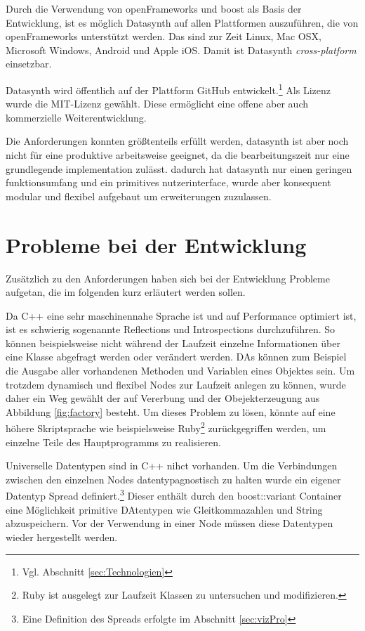 \documentclass[a4paper, 12pt, DIVcalc, onepage, pdftex, headsepline, footsepline]{scrreprt}
\begin{document}
Durch die Verwendung von openFrameworks und boost als Basis der Entwicklung,
ist es möglich Datasynth auf allen Plattformen auszuführen, die von openFrameworks
unterstützt werden. Das sind zur Zeit Linux, Mac OSX, Microsoft Windows, Android
und Apple iOS. Damit ist Datasynth \textit{cross-platform} einsetzbar.

Datasynth wird öffentlich auf der Plattform GitHub entwickelt.\footnote{Vgl.
Abschnitt \ref{sec:Technologien}} Als Lizenz wurde die MIT-Lizenz gewählt.
Diese ermöglicht eine offene aber auch kommerzielle Weiterentwicklung.

Die Anforderungen konnten größtenteils erfüllt werden, datasynth ist aber noch nicht für eine produktive
arbeitsweise geeignet, da die bearbeitungszeit nur eine grundlegende implementation
zulässt. dadurch hat datasynth nur einen geringen funktionsumfang und ein primitives
nutzerinterface, wurde aber konsequent modular und flexibel aufgebaut um erweiterungen
zuzulassen.

\section{Probleme bei der Entwicklung}
\label{sec:Probleme}
Zusätzlich zu den Anforderungen haben sich bei der Entwicklung Probleme aufgetan,
die im folgenden kurz erläutert werden sollen.

Da C++ eine sehr maschinennahe Sprache ist und auf Performance optimiert ist,
ist es schwierig sogenannte Reflections und Introspections durchzuführen.
So können beispielsweise nicht während der Laufzeit einzelne Informationen
über eine Klasse abgefragt werden oder verändert werden. DAs können zum Beispiel
die Ausgabe aller vorhandenen Methoden und Variablen eines Objektes sein.
Um trotzdem dynamisch und flexibel Nodes zur Laufzeit anlegen zu können, wurde
daher ein Weg gewählt der auf Vererbung und der Obejekterzeugung aus Abbildung
\ref{fig:factory} besteht. Um dieses Problem zu lösen, könnte auf eine
höhere Skriptsprache wie beispielsweise Ruby\footnote{Ruby ist ausgelegt
zur Laufzeit Klassen zu untersuchen und modifizieren.} zurückgegriffen werden,
um einzelne Teile des Hauptprogramms zu realisieren.

Universelle Datentypen sind in C++ nihct vorhanden. Um die Verbindungen
zwischen den einzelnen Nodes datentypagnostisch zu halten wurde ein
eigener Datentyp Spread definiert.\footnote{Eine Definition des Spreads erfolgte im Abschnitt \ref{sec:vizPro}}
Dieser enthält durch den boost::variant Container eine Möglichkeit primitive DAtentypen
wie Gleitkommazahlen und String abzuspeichern. Vor der Verwendung in einer Node müssen diese
Datentypen wieder hergestellt werden.
\end{document}
